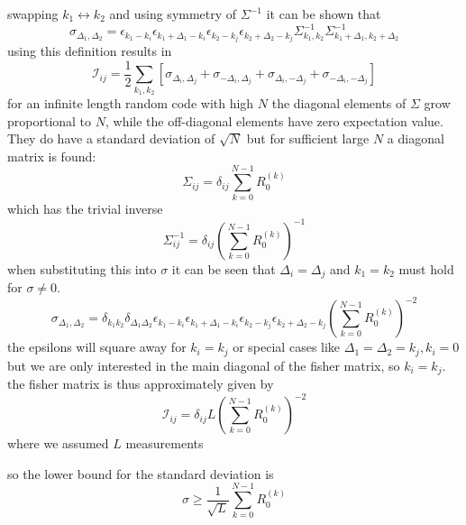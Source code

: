 \documentclass[18pt,a4paper]{extarticle}
\begin{document}
swapping $k_1 \leftrightarrow k_2$ and using symmetry of $\Sigma^{-1}$ it can be shown that
\begin{equation}
\sigma_{\Delta_1, \Delta_2} =
\epsilon_{k_1 - k_i}\epsilon_{k_1 + \Delta_1 - k_i}
\epsilon_{k_2 - k_j}\epsilon_{k_2 + \Delta_2 - k_j}
\Sigma^{-1}_{k_1, k_2}
\Sigma^{-1}_{k_1 + \Delta_1, k_2 + \Delta_2}
\end{equation}
using this definition results in
\begin{equation}
\mathcal{I}_{ij} = \frac{1}{2}\sum_{k_1, k_2}
\left[\sigma_{\Delta_i, \Delta_j}+\sigma_{-\Delta_i, \Delta_j}+
\sigma_{\Delta_i, -\Delta_j}+\sigma_{-\Delta_i, -\Delta_j}\right]
\end{equation}
for an infinite length random code with high $N$ the diagonal elements of $\Sigma$ grow proportional to $N$, while the off-diagonal elements have zero expectation value.
They do have a standard deviation of $\sqrt{N}$ but for sufficient large $N$ a diagonal matrix is found:
\begin{equation}
\Sigma_{ij} = \delta_{ij} \sum_{k=0}^{N-1} R_{0}^{(k)}
\end{equation}
which has the trivial inverse
\begin{equation}
\Sigma^{-1}_{ij} = \delta_{ij} \left(\sum_{k=0}^{N-1} R_{0}^{(k)}\right)^{-1}
\end{equation}
when substituting this into $\sigma$ it can be seen that $\Delta_i=\Delta_j$ and $k_1=k_2$ must hold for $\sigma \neq 0$.
\begin{equation}
\sigma_{\Delta_1, \Delta_2} = \delta_{k_1 k_2}\delta_{\Delta_1\Delta_2}
\epsilon_{k_1 - k_i}\epsilon_{k_1 + \Delta_1 - k_i}
\epsilon_{k_2 - k_j}\epsilon_{k_2 + \Delta_2 - k_j}
\left(\sum_{k=0}^{N-1} R_{0}^{(k)}\right)^{-2}
\end{equation}
the epsilons will square away for $k_i=k_j$ or special cases like $\Delta_1 = \Delta_2 = k_j, k_i=0$ but we are only interested in the main diagonal of the fisher matrix, so $k_i=k_j$.
the fisher matrix is thus approximately given by
\begin{equation}
\mathcal{I}_{ij} = \delta_{ij} L \left(\sum_{k=0}^{N-1} R_{0}^{(k)}\right)^{-2}
\end{equation}
where we assumed $L$ measurements 

so the lower bound for the standard deviation is
\begin{equation}
\sigma \geq \frac{1}{\sqrt{L}}\sum_{k=0}^{N-1} R_{0}^{(k)}
\end{equation}
\end{document}
